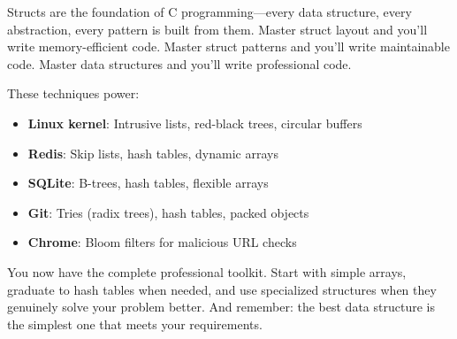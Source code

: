 \begin{tipbox}
Structs are the foundation of C programming---every data structure, every abstraction, every pattern is built from them. Master struct layout and you'll write memory-efficient code. Master struct patterns and you'll write maintainable code. Master data structures and you'll write professional code.

These techniques power:
\begin{itemize}
    \item \textbf{Linux kernel}: Intrusive lists, red-black trees, circular buffers
    \item \textbf{Redis}: Skip lists, hash tables, dynamic arrays
    \item \textbf{SQLite}: B-trees, hash tables, flexible arrays
    \item \textbf{Git}: Tries (radix trees), hash tables, packed objects
    \item \textbf{Chrome}: Bloom filters for malicious URL checks
\end{itemize}

You now have the complete professional toolkit. Start with simple arrays, graduate to hash tables when needed, and use specialized structures when they genuinely solve your problem better. And remember: the best data structure is the simplest one that meets your requirements.
\end{tipbox}
